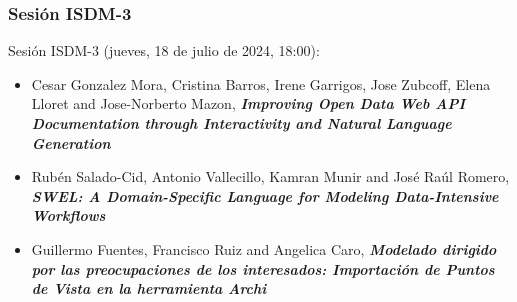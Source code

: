 \begin{frame}
  \frametitle{Sesión ISDM-3}
Sesión ISDM-3 (jueves, 18 de julio de 2024, 18:00):
\begin{itemize}

\item \small{Cesar Gonzalez Mora, Cristina Barros, Irene Garrigos, Jose Zubcoff, Elena Lloret and Jose-Norberto Mazon}, %
      {\bfseries\itshape Improving Open Data Web API Documentation through Interactivity and Natural Language Generation}

\item \small{Rubén Salado-Cid, Antonio Vallecillo, Kamran Munir and José Raúl Romero}, %
      {\bfseries\itshape SWEL: A Domain-Specific Language for Modeling Data-Intensive Workflows}

\item \small{Guillermo Fuentes, Francisco Ruiz and Angelica Caro}, %
      {\bfseries\itshape Modelado dirigido por las preocupaciones de los interesados: Importación de Puntos de Vista en la herramienta Archi}

\end{itemize}
\end{frame}